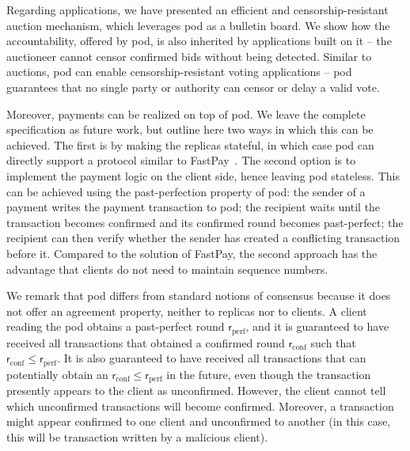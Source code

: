 \documentclass[pdflatex,sn-mathphys-num]{sn-jnl}%
\theoremstyle{thmstyleone}%
\theoremstyle{thmstyletwo}%
\theoremstyle{thmstylethree}%
\newcommand{\podtm}{\textsf{pod}\xspace}
\newcommand{\operand}[1]{\textsf{#1}}
\newcommand{\round}{\operand{r}\xspace}
\newcommand{\rconf}{\ensuremath{\round_\text{conf}}\xspace}
\newcommand{\rperf}{\ensuremath{\round_\text{perf}}\xspace}
\begin{document}
Regarding applications, we have presented an efficient and censorship-resistant auction mechanism, which leverages \podtm as a bulletin board. We show how the accountability, offered by \podtm, is also inherited by applications built on it -- the auctioneer cannot censor confirmed bids without being detected. Similar to auctions, \podtm can enable censorship-resistant voting applications -- \podtm guarantees that no single party or authority can censor or delay a valid vote.

Moreover, payments can be realized on top of \podtm. We leave the complete specification as future work, but outline here two ways in which this can be achieved. The first is by making the replicas stateful, in which case \podtm can directly support a protocol similar to FastPay~\cite{DBLP:conf/aft/BaudetDS20}. The second option is to implement the payment logic on the client side, hence leaving \podtm stateless. This can be achieved using the past-perfection property of \podtm: the sender of a payment  writes the payment transaction to \podtm; the recipient waits until the transaction becomes confirmed and its confirmed round becomes past-perfect; the recipient can then verify whether the sender has created a conflicting transaction before it. Compared to the solution of FastPay, the second approach has the advantage that clients do not need to maintain sequence numbers.

We remark that \podtm differs from standard notions of consensus because it does not offer an agreement property, neither to replicas nor to clients. A client reading the \podtm obtains a past-perfect round \rperf, and it is guaranteed to have received all transactions that obtained a confirmed round \rconf such that $\rconf \leq \rperf$. It is also guaranteed to have received all transactions that can potentially obtain an $\rconf \leq \rperf$ in the future, even though the transaction presently appears to the client as unconfirmed. However, the client cannot tell which unconfirmed transactions will become confirmed. Moreover, a transaction might appear confirmed to one client and unconfirmed to another (in this case, this will be transaction written by a malicious client).
\end{document}
